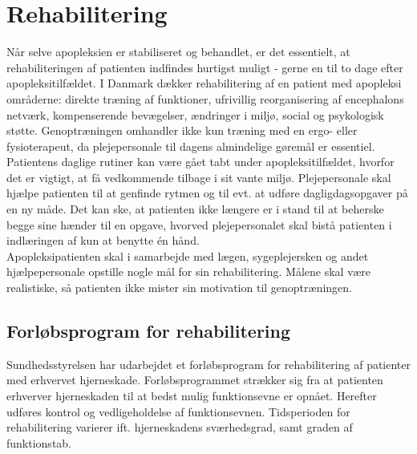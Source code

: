 \section{Rehabilitering}
Når selve apopleksien er stabiliseret og behandlet, er det essentielt, at rehabiliteringen af patienten indfindes hurtigst muligt - gerne en til to dage efter apopleksitilfældet. I Danmark dækker rehabilitering af en patient med apopleksi områderne: direkte træning af funktioner, ufrivillig reorganisering af encephalons netværk, kompenserende bevægelser, ændringer i miljø, social og psykologisk støtte. Genoptræningen omhandler ikke kun træning med en ergo- eller fysioterapeut, da plejepersonale til dagens almindelige gøremål er essentiel. Patientens daglige rutiner kan være gået tabt under apopleksitilfældet, hvorfor det er vigtigt, at få vedkommende tilbage i sit vante miljø. Plejepersonale skal hjælpe patienten til at genfinde rytmen og til evt. at udføre dagligdagsopgaver på en ny måde. Det kan ske, at patienten ikke længere er i stand til at beherske begge sine hænder til en opgave, hvorved plejepersonalet skal bistå patienten i indlæringen af kun at benytte én hånd. \cite{Kruuse2015} \\
Apopleksipatienten skal i samarbejde med lægen, sygeplejersken og andet hjælpepersonale opstille nogle mål for sin rehabilitering. Målene skal være realistiske, så patienten ikke mister sin motivation til genoptræningen.  \cite{Kruuse2015}

\subsection{Forløbsprogram for rehabilitering} 
Sundhedsstyrelsen har udarbejdet et forløbsprogram for rehabilitering af patienter med erhvervet hjerneskade. Forløbsprogrammet strækker sig fra at patienten erhverver hjerneskaden til at bedst mulig funktionsevne er opnået. Herefter udføres kontrol og vedligeholdelse af funktionsevnen. Tidsperioden for rehabilitering varierer ift. hjerneskadens sværhedsgrad, samt graden af funktionstab. %
\cite{Sundhedsstyrelsen2011a}

